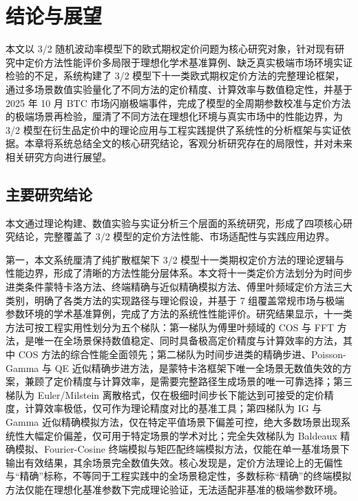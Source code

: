 \chapter{结论与展望}
\label{chap:conclusion}

本文以 3/2 随机波动率模型下的欧式期权定价问题为核心研究对象，针对现有研究中定价方法性能评价多局限于理想化学术基准算例、缺乏真实极端市场环境实证检验的不足，系统构建了 3/2 模型下十一类欧式期权定价方法的完整理论框架，通过多场景数值实验量化了不同方法的定价精度、计算效率与数值稳定性，并基于 2025 年 10 月 BTC 市场闪崩极端事件，完成了模型的全周期参数校准与定价方法的极端场景再检验，厘清了不同方法在理想化环境与真实市场中的性能边界，为 3/2 模型在衍生品定价中的理论应用与工程实践提供了系统性的分析框架与实证依据。本章将系统总结全文的核心研究结论，客观分析研究存在的局限性，并对未来相关研究方向进行展望。

\section{主要研究结论}

本文通过理论构建、数值实验与实证分析三个层面的系统研究，形成了四项核心研究结论，完整覆盖了 3/2 模型的定价方法性能、市场适配性与实践应用边界。

第一，本文系统厘清了纯扩散框架下 3/2 模型十一类期权定价方法的理论逻辑与性能边界，形成了清晰的方法性能分层体系。本文将十一类定价方法划分为时间步进类条件蒙特卡洛方法、终端精确与近似精确模拟方法、傅里叶频域定价方法三大类别，明确了各类方法的实现路径与理论假设，并基于 7 组覆盖常规市场与极端参数环境的学术基准算例，完成了方法的系统性性能评价。研究结果显示，十一类方法可按工程实用性划分为五个梯队：第一梯队为傅里叶频域的 COS 与 FFT 方法，是唯一在全场景保持数值稳定、同时具备极高定价精度与计算效率的方法，其中 COS 方法的综合性能全面领先；第二梯队为时间步进类的精确步进、Poisson-Gamma 与 QE 近似精确步进方法，是蒙特卡洛框架下唯一全场景无数值失效的方案，兼顾了定价精度与计算效率，是需要完整路径生成场景的唯一可靠选择；第三梯队为 Euler/Milstein 离散格式，仅在极细时间步长下能达到可接受的定价精度，计算效率极低，仅可作为理论精度对比的基准工具；第四梯队为 IG 与 Gamma 近似精确模拟方法，仅在特定平值场景下偏差可控，绝大多数场景出现系统性大幅定价偏差，仅可用于特定场景的学术对比；完全失效梯队为 Baldeaux 精确模拟、Fourier-Cosine 终端模拟与矩匹配终端模拟方法，仅能在单一基准场景下输出有效结果，其余场景完全数值失效。核心发现是，定价方法理论上的无偏性与“精确”标称，不等同于工程实践中的全场景稳定性，多数标称“精确”的终端模拟方法仅能在理想化基准参数下完成理论验证，无法适配非基准的极端参数环境。

